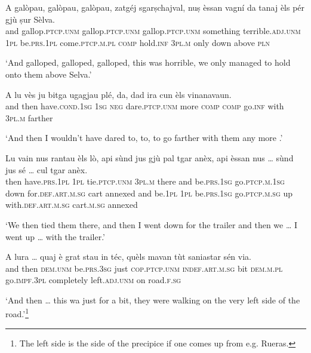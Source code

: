 \begin{linenumbers}
\gll  A galòpau, galòpau, galòpau, zatgéj sgarṣchajval, nuṣ èssan vagní da tanaj èls pér gjù ṣur Sèlva\footnotemark.  \\ 
and gallop.\textsc{ptcp.unm} gallop.\textsc{ptcp.unm} gallop.\textsc{ptcp.unm} something terrible.\textsc{adj.unm} \textsc{1pl} be.\textsc{prs.1pl} come.\textsc{ptcp.m.pl}   \textsc{comp} hold.\textsc{inf} \textsc{3pl.m} only down above \textsc{pln}  \\
\end{linenumbers}
\medskip
\glt `And galloped, galloped, galloped, this was horrible, we only managed to hold onto them above Selva.'
\medskip

\begin{linenumbers}
\gll  A lu vès ju bitga ugagjau plé, da, dad ira cun èls vinanavaun.\\
and then have.\textsc{cond.1sg} \textsc{1sg} \textsc{neg} dare.\textsc{ptcp.unm} more \textsc{comp} \textsc{comp} go.\textsc{inf} with \textsc{3pl.m} farther\\
\end{linenumbers}
\medskip
\glt `And then I wouldn’t have dared to, to, to go farther with them any more .'
\medskip

\begin{linenumbers}
\gll Lu vain nus rantau èls lò, api sùnd jus gjù pal tgar anèx, api èssan nus … sùnd jus sé … cul tgar anèx.\\
then have.\textsc{prs.1pl} \textsc{1pl} tie.\textsc{ptcp.unm} \textsc{3pl.m} there and be.\textsc{prs.1sg} go.\textsc{ptcp.m.1sg} down for.\textsc{def.art.m.sg} cart annexed and be.\textsc{1pl} \textsc{1pl} {} be.\textsc{prs.1sg} go.\textsc{ptcp.m.sg} up {} with.\textsc{def.art.m.sg} cart.\textsc{m.sg} annexed \\
\end{linenumbers}
\medskip
\glt `We then tied them there, and then I went down for the trailer and then we … I went up … with the trailer.'
\medskip

\begin{linenumbers}
\gll A lura … quaj è grat stau in téc, quèls mavan tùt saniastar sén via.   \\
and then {} \textsc{dem.unm} be.\textsc{prs.3sg} just \textsc{cop.ptcp.unm} \textsc{indef.art.m.sg} bit \textsc{dem.m.pl} go.\textsc{impf.3pl} completely left.\textsc{adj.unm} on road.\textsc{f.sg}  \\
\end{linenumbers}
\medskip
\glt `And then … this wa just for a bit, they were walking on the very left side of the road.'\footnote{The left side is the side of the precipice if one comes up from e.g. Rueras.}
\medskip

